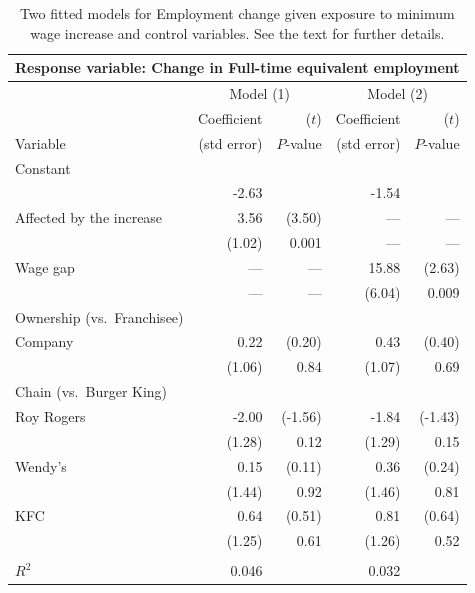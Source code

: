\begin{table}[t]
\caption{Two fitted models for Employment change
given exposure to minimum wage increase and control variables. See the
text for further details.}
\label{t_fastfood_models}
\begin{center}
\begin{tabular}{|l|rr|rr|}\hline
\multicolumn{5}{|l|}{Response
variable: Change in Full-time equivalent employment}\\ \hline
& \multicolumn{2}{|c|}{Model (1)} &
 \multicolumn{2}{|c|}{Model (2)} \\
& Coefficient & ($t$) & Coefficient & ($t$) \\
Variable & (std error)& $P$-value & (std error)& $P$-value \\  \hline
Constant & & & & \\
& -2.63 & & -1.54 & \\
Affected by the increase & 3.56 & (3.50)& --- & --- \\
 & (1.02) & 0.001 & --- & --- \\
Wage gap & --- & --- & 15.88 & (2.63)\\
& --- & --- & (6.04) & 0.009 \\
Ownership (vs.\ Franchisee)& & & & \\
Company & 0.22 & (0.20)& 0.43 & (0.40) \\
& (1.06) & 0.84& (1.07) & 0.69 \\
Chain (vs.\ Burger King) & & & & \\
Roy Rogers & -2.00 & (-1.56)& -1.84 & (-1.43)\\
& (1.28) & 0.12 & (1.29)& 0.15\\
Wendy's & 0.15 & (0.11)& 0.36 & (0.24)\\
& (1.44) & 0.92& (1.46)& 0.81\\
KFC & 0.64 & (0.51)& 0.81 & (0.64)\\
& (1.25)& 0.61 & (1.26)& 0.52 \\ \hline
 & & & & \\
$R^{2}$ & 0.046& & 0.032 & \\
\hline
\end{tabular}
\end{center}

\end{table}

